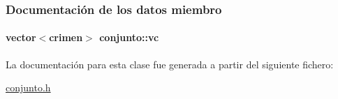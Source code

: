 \subsubsection{Documentación de los datos miembro}
\hypertarget{classconjunto_aed485e92bb3d8b2c82fc85657947761d}{
\paragraph[{vc}]{\setlength{\rightskip}{0pt plus 5cm}vector$<${\bf crimen}$>$ conjunto\-::vc\hspace{0.3cm}{\ttfamily [private]}}}\label{classconjunto_aed485e92bb3d8b2c82fc85657947761d}


La documentación para esta clase fue generada a partir del siguiente fichero\-:\begin{DoxyCompactItemize}
\item 
\hyperlink{conjunto_8h}{conjunto.\-h}\end{DoxyCompactItemize}
